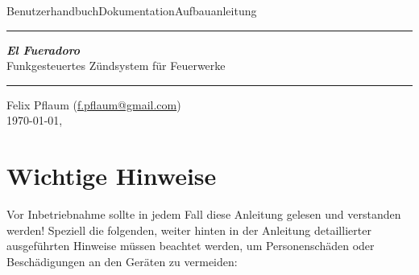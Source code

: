 \documentclass[paper=a4, parskip, numbers=noenddot, toc=listof, headsepline]{scrbook}
\newcommand{\anlage}{\emph{El Fueradoro}}
\begin{document}
	\begin{titlepage}
		\thispagestyle{empty}
		{\sffamily\LARGE Benutzerhandbuch{\hfill}Dokumentation{\hfill}Aufbauanleitung}\\ \hrule \vspace*{\fill}
		\begin{center}{\fontsize{90pt}{90pt} \sffamily\textbf{\anlage}} \\ \vspace{2em}
			{\LARGE \sffamily Funkgesteuertes Zündsystem für Feuerwerke}
		\end{center}
		\vspace*{\fill}
		\hrule
		\begin{center}
			\sffamily\Large Felix Pflaum (\href{mailto:f.pflaum@gmail.com}{f.pflaum@gmail.com})\\
			\normalsize \ddmmyyyydate\today, \currenttime
		\end{center}
	\end{titlepage}
	\chapter*{Wichtige Hinweise}

		Vor Inbetriebnahme sollte in jedem Fall diese Anleitung gelesen und verstanden werden! Speziell die folgenden, weiter hinten in der Anleitung detaillierter ausgeführten Hinweise müssen beachtet werden, um Personenschäden oder Beschädigungen an den Geräten zu vermeiden:
\end{document}
